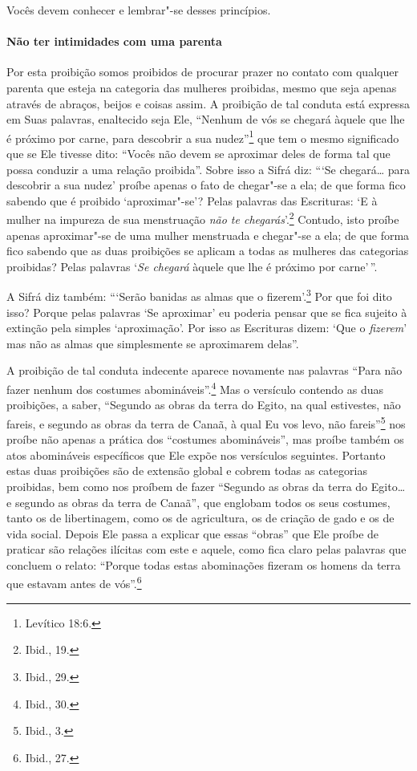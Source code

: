 \begin{multicols}{2}
Vocês devem conhecer e lembrar"-se desses princípios.

\paragraph{Não ter intimidades com uma parenta}

Por esta proibição somos proibidos de procurar prazer no contato com
qualquer parenta que esteja na categoria das mulheres proibidas, mesmo
que seja apenas através de abraços, beijos e coisas assim. A proibição
de tal conduta está expressa em Suas palavras, enaltecido seja Ele,
``Nenhum de vós se chegará àquele que lhe é próximo por carne, para
descobrir a sua nudez''\footnote{Levítico 18:6.} que tem o mesmo significado que
se Ele tivesse dito: ``Vocês não devem se aproximar deles de forma tal
que possa conduzir a uma relação proibida''. Sobre isso a Sifrá\starr{} diz:
```Se chegará\ldots{} para descobrir a sua nudez' proíbe apenas o fato de
chegar"-se a ela; de que forma fico sabendo que é proibido
`aproximar"-se'? Pelas palavras das Escrituras: `E à mulher na impureza
de sua menstruação \emph{não te chegarás}'.\footnote{Ibid., 19.} Contudo, isto
proíbe apenas aproximar"-se de uma mulher menstruada e chegar"-se a ela;
de que forma fico sabendo que as duas proibições se aplicam a todas as
mulheres das categorias proibidas? Pelas palavras `\emph{Se chegará}
àquele que lhe é próximo por carne'\,''.

A Sifrá\starr{} diz também: ```Serão banidas as almas que o fizerem'.\footnote{Ibid.,
29.} Por que foi dito isso? Porque pelas palavras `Se aproximar' eu
poderia pensar que se fica sujeito à extinção pela simples
`aproximação'. Por isso as Escrituras dizem: `Que o \emph{fizerem}' mas
não as almas que simplesmente se aproximarem delas''.

A proibição de tal conduta indecente aparece novamente nas palavras
``Para não fazer nenhum dos costumes abomináveis''.\footnote{Ibid., 30.} Mas o
versículo contendo as duas proibições, a saber, ``Segundo as obras da
terra do Egito, na qual estivestes, não fareis, e segundo as obras da
terra de Canaã, à qual Eu vos levo, não fareis''\footnote{Ibid., 3.} nos proíbe
não apenas a prática dos ``costumes abomináveis'', mas proíbe também os
atos abomináveis específicos que Ele expõe nos versículos seguintes.
Portanto estas duas proibições são de extensão global e cobrem todas as
categorias proibidas, bem como nos proíbem de fazer ``Segundo as obras
da terra do Egito\ldots{} e segundo as obras da terra de Canaã'', que
englobam todos os seus costumes, tanto os de libertinagem, como os de
agricultura, os de criação de gado e os de vida social. Depois Ele
passa a explicar que essas ``obras'' que Ele proíbe de praticar são
relações ilícitas com este e aquele, como fica claro pelas palavras que
concluem o relato: ``Porque todas estas abominações fizeram os homens da
terra que estavam antes de vós''.\footnote{Ibid., 27.}


\end{multicols}
